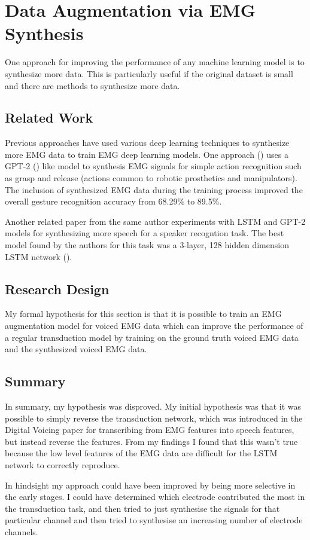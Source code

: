 \section{Data Augmentation via EMG Synthesis}

One approach for improving the performance of any machine learning model
is to synthesize more data. This is particularly useful if the original
dataset is small and there are methods to synthesize more data.

\subsection{Related Work}

Previous approaches have used various deep learning techniques to synthesize
more EMG data to train EMG deep learning models. One approach
(\cite{gpt_2_emg_synth}) uses a GPT-2 (\cite{gpt_2_original}) like model
to synthesis EMG signals for simple action recognition such as grasp and
release (actions common to robotic prosthetics and manipulators). The inclusion
of synthesized EMG data during the training process improved the overall
gesture recognition accuracy from 68.29\% to 89.5\%.

Another related paper from the same author experiments with LSTM and GPT-2
models for synthesizing more speech for a speaker recogntion task. The
best model found by the authors for this task was a
3-layer, 128 hidden dimension LSTM network (\cite{speech_synth_lstm}).

\subsection{Research Design}

My formal hypothesis for this section is that it is possible to train
an EMG augmentation model for voiced EMG data which can improve the
performance of a regular transduction model by training on the
ground truth voiced EMG data and the synthesized voiced EMG data.

\subsection{Summary}

In summary, my hypothesis was disproved.
My initial hypothesis was that it was possible to simply reverse the
transduction network, which was introduced in the Digital Voicing paper
for transcribing from EMG features into speech features, but instead
reverse the features.
From my findings I found that this wasn't true because the low level 
features of the EMG data are difficult for the LSTM network to correctly reproduce.

In hindsight my approach could have been improved by being more selective in
the early stages. I could have determined which electrode contributed the most
in the transduction task, and then tried to just synthesise the signals for that 
particular channel and then tried to synthesise an increasing number of electrode channels.